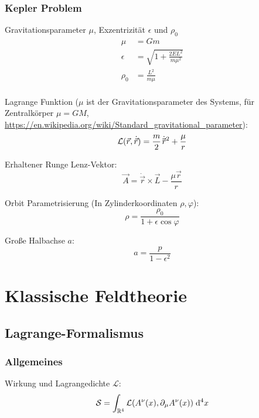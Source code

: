 \documentclass[11pt]{article}
\numberwithin{equation}{section}
\begin{document}
			\subsubsection{Kepler Problem}
				\noindent
				Gravitationsparameter $\mu$, Exzentrizität $\epsilon$ und $\rho_0$
				\begin{equation}
					\begin{aligned}
						\mu &= G m \\
						\epsilon &= \sqrt{1+\frac{2 E L^2}{m \mu^2}} \\
						\rho_0 &= \frac{L^2}{m\mu} \\
					\end{aligned}
				\end{equation}

				\noindent
				Lagrange Funktion ($\mu$ ist der Gravitationsparameter des Systems, für Zentralkörper $\mu=GM$, \url{https://en.wikipedia.org/wiki/Standard_gravitational_parameter}):
				\begin{equation}
					\mathcal{L}(\vec{r},\dot{\vec{r}}) = \frac{m}{2} \dot{\pvec{r}}^2 + \frac{\mu}{r}
				\end{equation}

				\noindent
				Erhaltener Runge Lenz-Vektor:
				\begin{equation}
					\vec{A} = \dot{\vec{r}}\times\vec{L} - \frac{\mu \vec{r}}{r}
				\end{equation}

				\noindent
				Orbit Parametrisierung (In Zylinderkoordinaten $\rho, \varphi$):
				\begin{equation}
					\rho = \frac{\rho_0}{1+\epsilon \cos\varphi}
				\end{equation}

				\noindent
				Große Halbachse $a$:
				\begin{equation}
					a = \frac{p}{1-\epsilon^2}
				\end{equation}

	\newpage
	\section{Klassische Feldtheorie}
		\subsection{Lagrange-Formalismus}
			\subsubsection{Allgemeines}
				\noindent
				Wirkung und Lagrangedichte $\mathcal{L}$:
				\begin{equation}
					\mathcal{S} = \int_{\mathbb{R}^4} \mathcal{L}(A^\nu(x),\partial_\mu A^\nu(x)) \;\mathrm{d}^4 x
				\end{equation}
\end{document}
